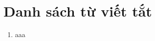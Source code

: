 \chapter*{Danh sách từ viết tắt}
\label{Appendix:Abbreviations}

\begin{enumerate}
\item aaa
\end{enumerate}